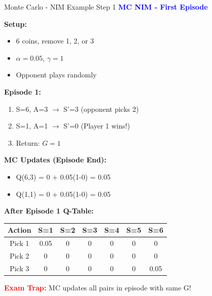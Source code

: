 \documentclass[8pt]{beamer}
\begin{document}
	\begin{frame}{Monte Carlo - NIM Example Step 1}
		\fontsize{6.5}{7.5}\selectfont
		\textcolor{blue}{\textbf{MC NIM - First Episode}}
		
		\textbf{Setup:}
		\begin{itemize}
			\item 6 coins, remove 1, 2, or 3
			\item $\alpha = 0.05$, $\gamma = 1$
			\item Opponent plays randomly
		\end{itemize}
		
		\textbf{Episode 1:}
		\begin{enumerate}
			\item S=6, A=3 $\rightarrow$ S'=3 (opponent picks 2)
			\item S=1, A=1 $\rightarrow$ S'=0 (Player 1 wins!)
			\item Return: $G = 1$
		\end{enumerate}
		
		\textbf{MC Updates (Episode End):}
		\begin{itemize}
			\item Q(6,3) = 0 + 0.05(1-0) = 0.05
			\item Q(1,1) = 0 + 0.05(1-0) = 0.05
		\end{itemize}
		
		\textbf{After Episode 1 Q-Table:}
		\begin{tabular}{|c|c|c|c|c|c|c|}
			\hline
			Action & S=1 & S=2 & S=3 & S=4 & S=5 & S=6 \\
			\hline
			Pick 1 & 0.05 & 0 & 0 & 0 & 0 & 0 \\
			\hline
			Pick 2 & 0 & 0 & 0 & 0 & 0 & 0 \\
			\hline
			Pick 3 & 0 & 0 & 0 & 0 & 0 & 0.05 \\
			\hline
		\end{tabular}
		
		\textcolor{red}{\textbf{Exam Trap:}} MC updates all pairs in episode with same G!
	\end{frame}
	
\end{document}
